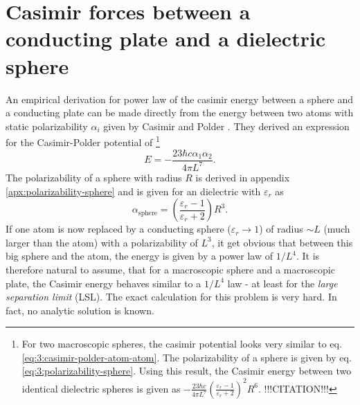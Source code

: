 \section{Casimir forces between a conducting plate and a dielectric sphere}
\label{sec:3:casimir-plate-sphere}

An empirical derivation for power law of the casimir energy between a sphere and a conducting plate can be made directly from the energy between two atoms with static polarizability $\alpha_i$ given by Casimir and Polder \cite{Casimir_1948a}. They derived an expression for the Casimir-Polder potential of \footnote{For two macroscopic spheres, the casimir potential looks very similar to eq. \eqref{eq:3:casimir-polder-atom-atom}. The polarizability of a sphere is given by eq. \eqref{eq:3:polarizability-sphere}. Using this result, the Casimir energy between two identical dielectric spheres is given as $-\frac{23\hbar c}{4\pi L^7}\left(\frac{\varepsilon_r-1}{\varepsilon_r+2}\right)^2R^6$. !!!CITATION!!!}
\begin{equation}\label{eq:3:casimir-polder-atom-atom}
  E = -\frac{23\hbar c \alpha_1 \alpha_2}{4 \pi L^7} .
\end{equation}
The polarizability of a sphere with radius $R$ is derived in appendix \ref{apx:polarizability-sphere} and is given for an dielectric with $\varepsilon_r$ as 
\begin{equation} \label{eq:3:polarizability-sphere}
  \alpha_\mathrm{sphere} = \left(\frac{\varepsilon_r-1}{\varepsilon_r+2}\right)R^3 .
\end{equation}
If one atom is now replaced by a conducting sphere ($\varepsilon_r \rightarrow 1$) of radius $\sim L$ (much larger than the atom) with a polarizability of $L^3$, it get obvious that between this big sphere and the atom, the energy is given by a power law of $1/L^4$.
It is therefore natural to assume, that for a macroscopic sphere and a macroscopic plate, the Casimir energy behaves similar to a $1/L^4$ law - at least for the \textit{large separation limit} (LSL).
The exact calculation for this problem is very hard. In fact, no analytic solution is known.


